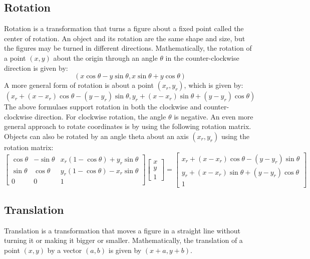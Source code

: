 \documentclass[12pt]{article}
\begin{document}
	\subsection{Rotation}
	Rotation is a transformation that turns a figure about a fixed point called the center of rotation. An object and its rotation are the same shape and size, but the figures may be turned in different directions.
	Mathematically, the rotation of a point $(x,y)$ about the origin through an angle $\theta$ in the counter-clockwise direction is given by:
	\[(x\cos\theta - y\sin\theta, x\sin\theta + y\cos\theta)\]
	A more general form of rotation is about a point $(x_{r}, y_{r})$, which is given by:
	\[(x_{r} + (x - x_{r})\cos\theta - (y - y_{r})\sin\theta, y_{r} + (x - x_{r})\sin\theta + (y - y_{r})\cos\theta)\]
	The above formulaes support rotation in both the clockwise and counter-clockwise direction. For clockwise rotation, the angle $\theta$ is negative.
	An even more general approach to rotate coordinates is by using the following rotation matrix. Objects can also be rotated by an angle theta about an axis $(x_{r}, y_{r})$ using the rotation matrix:
	\begin{equation*}
		\begin{bmatrix}
			\cos\theta & -\sin\theta & x_{r}(1 - \cos\theta) + y_{r}\sin\theta \\
			\sin\theta & \cos\theta & y_{r}(1 - \cos\theta) - x_{r}\sin\theta \\
			0 & 0 & 1
		\end{bmatrix}
		\begin{bmatrix}
			x \\
			y \\
			1
		\end{bmatrix}
		=	
		\begin{bmatrix}
			x_{r} + (x - x_{r})\cos\theta - (y - y_{r})\sin\theta \\
			y_{r} + (x - x_{r})\sin\theta + (y - y_{r})\cos\theta \\
			1
		\end{bmatrix}
	\end{equation*}

	\subsection{Translation}
	Translation is a transformation that moves a figure in a straight line without turning it or making it bigger or smaller.
	Mathematically, the translation of a point $(x,y)$ by a vector $(a,b)$ is given by $(x+a,y+b)$.
\end{document}
